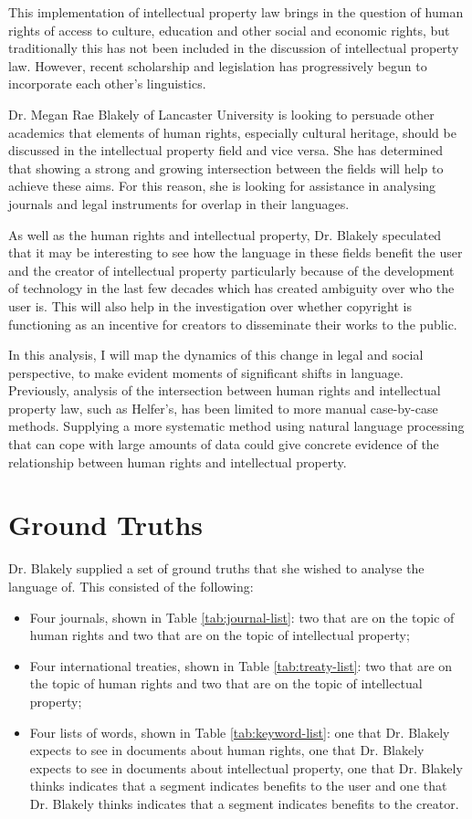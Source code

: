 		This implementation of intellectual property law brings in the question of human rights of access to culture, education and other social and economic rights, but traditionally this has not been included in the discussion of intellectual property law. However, recent scholarship and legislation has progressively begun to incorporate each other's linguistics\cite{mapping_ip_hr_helfer}.
			
		Dr. Megan Rae Blakely of Lancaster University is looking to persuade other academics that elements of human rights, especially cultural heritage, should be discussed in the intellectual property field and vice versa. She has determined that showing a strong and growing intersection between the fields will help to achieve these aims. For this reason, she is looking for assistance in analysing journals and legal instruments for overlap in their languages. 
		
		As well as the human rights and intellectual property, Dr. Blakely speculated that it may be interesting to see how the language in these fields benefit the user and the creator of intellectual property\cite{bileta_proposal_blakely} particularly because of the development of technology in the last few decades which has created ambiguity over who the user is. This will also help in the investigation over whether copyright is functioning as an incentive for creators to disseminate their works to the public.
		
		In this analysis, I will map the dynamics of this change in legal and social perspective, to make evident moments of significant shifts in language. Previously, analysis of the intersection between human rights and intellectual property law, such as Helfer's\cite{hr_ip_conflict_coexistence_helfer}, has been limited to more manual case-by-case methods. Supplying a more systematic method using natural language processing that can cope with large amounts of data could give concrete evidence of the relationship between human rights and intellectual property. 
	\section{Ground Truths}
		Dr. Blakely supplied a set of ground truths that she wished to analyse the language of. This consisted of the following:
		\begin{itemize}
			\item Four journals, shown in Table \ref{tab:journal-list}: two that are on the topic of human rights and two that are on the topic of intellectual property;
			\item Four international treaties, shown in Table \ref{tab:treaty-list}: two that are on the topic of human rights and two that are on the topic of intellectual property;
			\item Four lists of words, shown in Table \ref{tab:keyword-list}: one that Dr. Blakely expects to see in documents about human rights, one that Dr. Blakely expects to see in documents about intellectual property, one that Dr. Blakely thinks indicates that a segment indicates benefits to the user and one that Dr. Blakely thinks indicates that a segment indicates benefits to the creator.
		\end{itemize} 
